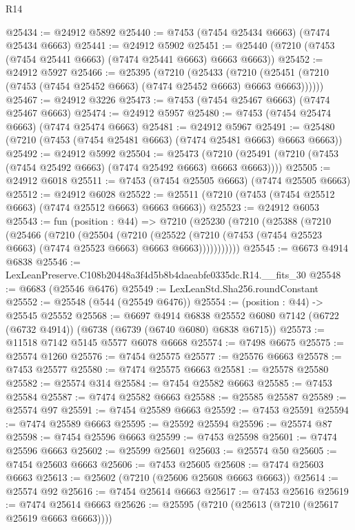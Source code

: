 \begin{lexlean}{R14}
\begin{coremodule}
@25434 := @24912 @5892
@25440 := @7453 (@7454 @25434 @6663) (@7474 @25434 @6663)
@25441 := @24912 @5902
@25451 := @25440 (@7210 (@7453 (@7454 @25441 @6663) (@7474 @25441 @6663) @6663 @6663))
@25452 := @24912 @5927
@25466 := @25395
    (@7210
      (@25433
        (@7210 (@25451 (@7210 (@7453 (@7454 @25452 @6663) (@7474 @25452 @6663) @6663 @6663))))))
@25467 := @24912 @3226
@25473 := @7453 (@7454 @25467 @6663) (@7474 @25467 @6663)
@25474 := @24912 @5957
@25480 := @7453 (@7454 @25474 @6663) (@7474 @25474 @6663)
@25481 := @24912 @5967
@25491 := @25480 (@7210 (@7453 (@7454 @25481 @6663) (@7474 @25481 @6663) @6663 @6663))
@25492 := @24912 @5992
@25504 := @25473
    (@7210 (@25491 (@7210 (@7453 (@7454 @25492 @6663) (@7474 @25492 @6663) @6663 @6663))))
@25505 := @24912 @6018
@25511 := @7453 (@7454 @25505 @6663) (@7474 @25505 @6663)
@25512 := @24912 @6028
@25522 := @25511 (@7210 (@7453 (@7454 @25512 @6663) (@7474 @25512 @6663) @6663 @6663))
@25523 := @24912 @6053
@25543 := fun (position : @44) =>
  @7210
    (@25230
      (@7210
        (@25388
          (@7210
            (@25466
              (@7210
                (@25504
                  (@7210
                    (@25522
                      (@7210 (@7453 (@7454 @25523 @6663) (@7474 @25523 @6663) @6663 @6663)))))))))))
@25545 := @6673 @4914 @6838
@25546 := LexLeanPreserve.C108b20448a3f4d5b8b4daeabfe0335dc.R14.__fits_30
@25548 := @6683 (@25546 @6476)
@25549 := LexLeanStd.Sha256.roundConstant
@25552 := @25548 (@544 (@25549 @6476))
@25554 := (position : @44) -> @25545 @25552
@25568 := @6697
    @4914
    @6838
    @25552
    @6080
    @7142
    (@6722 (@6732 @4914))
    (@6738 (@6739 (@6740 @6080) @6838 @6715))
@25573 := @11518 @7142 @5145 @5577 @6078 @6668
@25574 := @7498 @6675
@25575 := @25574 @1260
@25576 := @7454 @25575
@25577 := @25576 @6663
@25578 := @7453 @25577
@25580 := @7474 @25575 @6663
@25581 := @25578 @25580
@25582 := @25574 @314
@25584 := @7454 @25582 @6663
@25585 := @7453 @25584
@25587 := @7474 @25582 @6663
@25588 := @25585 @25587
@25589 := @25574 @97
@25591 := @7454 @25589 @6663
@25592 := @7453 @25591
@25594 := @7474 @25589 @6663
@25595 := @25592 @25594
@25596 := @25574 @87
@25598 := @7454 @25596 @6663
@25599 := @7453 @25598
@25601 := @7474 @25596 @6663
@25602 := @25599 @25601
@25603 := @25574 @50
@25605 := @7454 @25603 @6663
@25606 := @7453 @25605
@25608 := @7474 @25603 @6663
@25613 := @25602 (@7210 (@25606 @25608 @6663 @6663))
@25614 := @25574 @92
@25616 := @7454 @25614 @6663
@25617 := @7453 @25616
@25619 := @7474 @25614 @6663
@25626 := @25595 (@7210 (@25613 (@7210 (@25617 @25619 @6663 @6663))))

\end{coremodule}
\end{lexlean}
